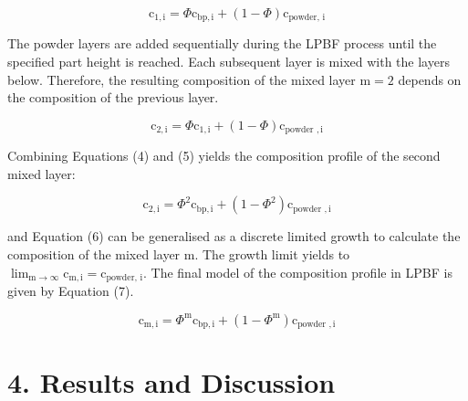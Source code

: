 \documentclass[10pt]{article}
\begin{document}
\begin{equation*}
\mathrm{c}_{1, \mathrm{i}}=\Phi \mathrm{c}_{\mathrm{bp}, \mathrm{i}}+(1-\Phi) \mathrm{c}_{\text {powder, } \mathrm{i}} \tag{4}
\end{equation*}


The powder layers are added sequentially during the LPBF process until the specified part height is reached. Each subsequent layer is mixed with the layers below. Therefore, the resulting composition of the mixed layer $\mathrm{m}=2$ depends on the composition of the previous layer.


\begin{equation*}
\mathrm{c}_{2, \mathrm{i}}=\Phi \mathrm{c}_{1, \mathrm{i}}+(1-\Phi) \mathrm{c}_{\text {powder }, \mathrm{i}} \tag{5}
\end{equation*}


Combining Equations (4) and (5) yields the composition profile of the second mixed layer:


\begin{equation*}
\mathrm{c}_{2, \mathrm{i}}=\Phi^{2} \mathrm{c}_{\mathrm{bp}, \mathrm{i}}+\left(1-\Phi^{2}\right) \mathrm{c}_{\text {powder }, \mathrm{i}} \tag{6}
\end{equation*}


and Equation (6) can be generalised as a discrete limited growth to calculate the composition of the mixed layer $\mathrm{m}$. The growth limit yields to $\lim _{\mathrm{m} \rightarrow \infty} \mathrm{c}_{\mathrm{m}, \mathrm{i}}=\mathrm{c}_{\text {powder, } \mathrm{i}}$. The final model of the composition profile in LPBF is given by Equation (7).


\begin{equation*}
\mathrm{c}_{\mathrm{m}, \mathrm{i}}=\Phi^{\mathrm{m}} \mathrm{c}_{\mathrm{bp}, \mathrm{i}}+\left(1-\Phi^{\mathrm{m}}\right) \mathrm{c}_{\text {powder }, \mathrm{i}} \tag{7}
\end{equation*}


\section*{4. Results and Discussion}
\end{document}
